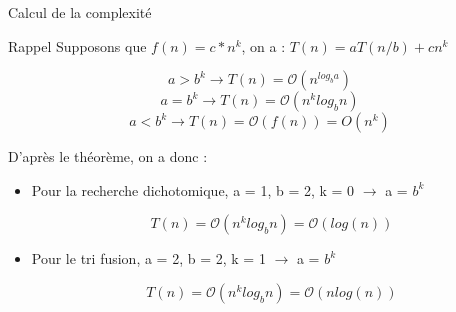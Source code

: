 \documentclass[10pt,xcolor=dvipsnames]{beamer}
\begin{document}
\begin{frame}{Calcul de la complexité}
    \begin{alertblock}{Rappel}
    Supposons que $f(n) = c*n^k$, on a : $T(n) = a T(n/b) + c n^k$

\begin{equation*}
    a > b^k \rightarrow T(n) = \mathcal{O}(n^{log_b a})
\end{equation*}
\begin{equation*}
    a = b^k \rightarrow T(n) = \mathcal{O}(n^k log_b n)
\end{equation*}
\begin{equation*}
    a < b^k \rightarrow T(n) = \mathcal{O}( f(n) ) = O(n^k)
\end{equation*}
    \end{alertblock}

    
D'après le théorème, on a donc :
    \begin{itemize}
     \item Pour la recherche dichotomique, \alert{a = 1, b = 2, k = 0} $\rightarrow$ a = $b^k$

     \vspace{-0.3cm}
     
\begin{equation*}
    T(n) = \mathcal{O}(n^k log_b n) = \mathcal{O}(log(n))
\end{equation*}
\medskip

\item Pour le tri fusion, \alert{a = 2, b = 2, k = 1} $\rightarrow$ a = $b^k$

     \vspace{-0.3cm}
\begin{equation*}
    T(n) = \mathcal{O}(n^k log_b n) = \mathcal{O}(nlog(n))
\end{equation*}
    \end{itemize}


% 
\end{frame}    
\end{document}
